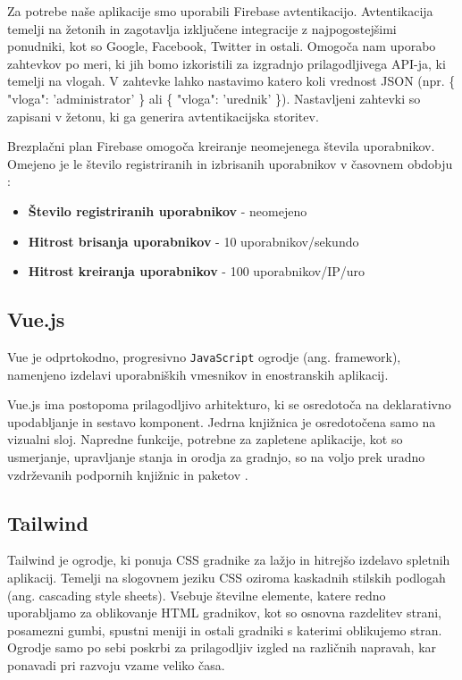 \documentclass[a4paper, 12pt]{book}
\begin{document}
Za potrebe naše aplikacije smo uporabili Firebase avtentikacijo. Avtentikacija temelji na žetonih in zagotavlja izključene integracije z najpogostejšimi ponudniki, kot so Google, Facebook, Twitter in ostali. Omogoča nam uporabo zahtevkov po meri, ki jih bomo izkoristili za izgradnjo prilagodljivega API-ja, ki temelji na vlogah. V zahtevke lahko nastavimo katero koli vrednost JSON (npr. \{ "vloga": 'administrator' \} ali \{ "vloga": 'urednik' \}). Nastavljeni zahtevki so zapisani v žetonu, ki ga generira avtentikacijska storitev.

Brezplačni plan Firebase omogoča kreiranje neomejenega števila uporabnikov. Omejeno je le število registriranih in izbrisanih uporabnikov v časovnem obdobju \cite{firebase-limits}:


\begin{itemize}
\item \textbf{Število registriranih uporabnikov} - neomejeno
\item \textbf{Hitrost brisanja uporabnikov} - 10 uporabnikov/sekundo
\item \textbf{Hitrost kreiranja uporabnikov} - 100 uporabnikov/IP/uro
\end{itemize}


\subsection{Vue.js}
\label{vue-js-section}
Vue je odprtokodno, progresivno \verb=JavaScript= ogrodje (ang. framework), namenjeno izdelavi uporabniških vmesnikov in enostranskih aplikacij.

Vue.js ima postopoma prilagodljivo arhitekturo, ki se osredotoča na deklarativno upodabljanje in sestavo komponent. Jedrna knjižnica je osredotočena samo na vizualni sloj. Napredne funkcije, potrebne za zapletene aplikacije, kot so usmerjanje, upravljanje stanja in orodja za gradnjo, so na voljo prek uradno vzdrževanih podpornih knjižnic in paketov \cite{vue-js-what-is}.

\subsection{Tailwind}
\label{tailwind-section}
Tailwind je ogrodje, ki ponuja CSS gradnike za lažjo in hitrejšo izdelavo spletnih aplikacij. Temelji na slogovnem jeziku CSS oziroma kaskadnih stilskih podlogah (ang. cascading style sheets). Vsebuje številne elemente, katere redno uporabljamo za oblikovanje HTML gradnikov, kot so osnovna razdelitev strani, posamezni gumbi, spustni meniji in ostali gradniki s katerimi oblikujemo stran. Ogrodje samo po sebi poskrbi za prilagodljiv izgled na različnih napravah, kar ponavadi pri razvoju vzame veliko časa.
\end{document}
